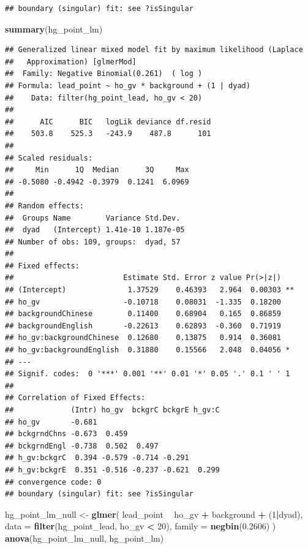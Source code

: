 \documentclass[]{article}
\newenvironment{Shaded}{\begin{snugshade}}{\end{snugshade}}
\newcommand{\DataTypeTok}[1]{\textcolor[rgb]{0.13,0.29,0.53}{#1}}
\newcommand{\DecValTok}[1]{\textcolor[rgb]{0.00,0.00,0.81}{#1}}
\newcommand{\FloatTok}[1]{\textcolor[rgb]{0.00,0.00,0.81}{#1}}
\newcommand{\KeywordTok}[1]{\textcolor[rgb]{0.13,0.29,0.53}{\textbf{#1}}}
\newcommand{\NormalTok}[1]{#1}
\newcommand{\OperatorTok}[1]{\textcolor[rgb]{0.81,0.36,0.00}{\textbf{#1}}}
\newcommand{\StringTok}[1]{\textcolor[rgb]{0.31,0.60,0.02}{#1}}
\begin{document}
\begin{verbatim}
## boundary (singular) fit: see ?isSingular
\end{verbatim}

\begin{Shaded}
\begin{Highlighting}[]
\KeywordTok{summary}\NormalTok{(hg_point_lm)}
\end{Highlighting}
\end{Shaded}

\begin{verbatim}
## Generalized linear mixed model fit by maximum likelihood (Laplace
##   Approximation) [glmerMod]
##  Family: Negative Binomial(0.261)  ( log )
## Formula: lead_point ~ ho_gv * background + (1 | dyad)
##    Data: filter(hg_point_lead, ho_gv < 20)
## 
##      AIC      BIC   logLik deviance df.resid 
##    503.8    525.3   -243.9    487.8      101 
## 
## Scaled residuals: 
##     Min      1Q  Median      3Q     Max 
## -0.5080 -0.4942 -0.3979  0.1241  6.0969 
## 
## Random effects:
##  Groups Name        Variance Std.Dev. 
##  dyad   (Intercept) 1.41e-10 1.187e-05
## Number of obs: 109, groups:  dyad, 57
## 
## Fixed effects:
##                         Estimate Std. Error z value Pr(>|z|)   
## (Intercept)              1.37529    0.46393   2.964  0.00303 **
## ho_gv                   -0.10718    0.08031  -1.335  0.18200   
## backgroundChinese        0.11400    0.68904   0.165  0.86859   
## backgroundEnglish       -0.22613    0.62893  -0.360  0.71919   
## ho_gv:backgroundChinese  0.12680    0.13875   0.914  0.36081   
## ho_gv:backgroundEnglish  0.31880    0.15566   2.048  0.04056 * 
## ---
## Signif. codes:  0 '***' 0.001 '**' 0.01 '*' 0.05 '.' 0.1 ' ' 1
## 
## Correlation of Fixed Effects:
##             (Intr) ho_gv  bckgrC bckgrE h_gv:C
## ho_gv       -0.681                            
## bckgrndChns -0.673  0.459                     
## bckgrndEngl -0.738  0.502  0.497              
## h_gv:bckgrC  0.394 -0.579 -0.714 -0.291       
## h_gv:bckgrE  0.351 -0.516 -0.237 -0.621  0.299
## convergence code: 0
## boundary (singular) fit: see ?isSingular
\end{verbatim}

\begin{Shaded}
\begin{Highlighting}[]
\NormalTok{hg_point_lm_null <-}\StringTok{ }\KeywordTok{glmer}\NormalTok{(}
\NormalTok{  lead_point }\OperatorTok{~}
\StringTok{    }\NormalTok{ho_gv }\OperatorTok{+}
\StringTok{    }\NormalTok{background }\OperatorTok{+}
\StringTok{    }\NormalTok{(}\DecValTok{1}\OperatorTok{|}\NormalTok{dyad),}
  \DataTypeTok{data =} \KeywordTok{filter}\NormalTok{(hg_point_lead, ho_gv }\OperatorTok{<}\StringTok{ }\DecValTok{20}\NormalTok{),}
  \DataTypeTok{family =} \KeywordTok{negbin}\NormalTok{(}\FloatTok{0.2606}\NormalTok{)}
\NormalTok{)}
\KeywordTok{anova}\NormalTok{(hg_point_lm_null, hg_point_lm)}
\end{Highlighting}
\end{Shaded}
\end{document}
